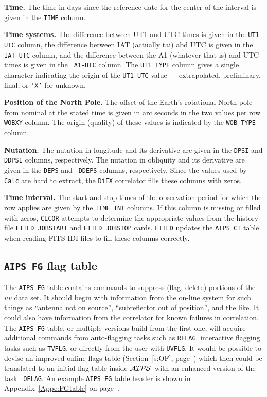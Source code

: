 \documentclass[twoside]{article}
\newcommand{\AIPS}{{$\cal AIPS\/$}}
\begin{document}
{\bf Time.} The time in days since the reference date for the center
of the interval is given in the {\tt TIME} column.

{\bf Time systems.} The difference between UT1 and UTC times is given
in the {\tt UT1-UTC} column, the difference between IAT (actually tai)
abd UTC is given in the {\tt IAT-UTC} column, and the difference
between the A1 (whatever that is) and UTC times is given in the {\tt
  A1-UTC} column.  The {\tt UT1 TYPE} column gives a single character
indicating the origin of the {\tt UT1-UTC} value --- extrapolated,
preliminary, final, or {\tt 'X'} for unknown.

{\bf Position of the North Pole.} The offset of the Earth's rotational
North pole from nominal at the stated time is given in arc seconds in
the two values per row {\tt WOBXY} column.  The origin (quality) of
these values is indicated by the {\tt WOB TYPE} column.

{\bf Nutation.} The nutation in longitude and its derivative are given
in the {\tt DPSI} and {\tt DDPSI} columns, respectively.  The nutation
in obliquity and its derivative are given in the {\tt DEPS} and {\tt
  DDEPS} columns, respectively.  Since the values used by {\tt Calc}
are hard to extract, the {\tt DiFX} correlator fills these columns
with zeros.

{\bf Time interval.} The start and stop times of the observation
period for which the row applies are given by the {\tt TIME INT}
columns.  If this column is missing or filled with zeros, {\tt CLCOR}
attempts to determine the appropriate values from the history file
{\tt FITLD JOBSTART} and {\tt FITLD JOBSTOP} cards.  {\tt FITLD}
updates the {\tt AIPS CT} table when reading FITS-IDI files to
fill these columns correctly.
\vfill\eject

\subsection{{\tt AIPS FG} flag table}
\label{s:FG}

The {\tt AIPS FG} table contains commands to suppress (flag, delete)
portions of the $uv$ data set.  It should begin with information from
the on-line system for such things as ``antenna not on source'',
``subreflector out of position'', and the like.  It could also have
information from the correlator for known failures in correlation.
The {\tt AIPS FG} table, or multiple versions build from the first
one, will acquire additional commands from auto-flagging tasks such as
{\tt RFLAG}. interactive flagging tasks such as {\tt TVFLG}, or
directly from the user with {\tt UVFLG}\@.  It would be possible to
devise an improved online-flags table (Section~\ref{s:OF},
page~\pageref{s:OF}) which then could be translated to an initial flag
table inside \AIPS\ with an enhanced version of the task {\tt
  OFLAG}\@.  An example {\tt AIPS FG} table header is
shown in Appendix~\ref{Appe:FGtable} on page~\pageref{Appe:FGtable}.
\end{document}
